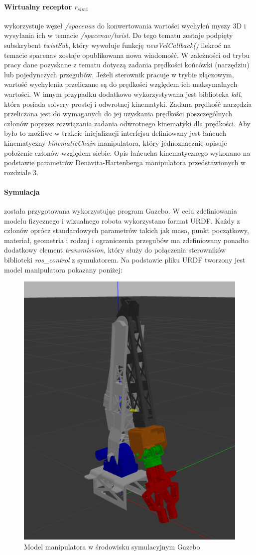 \documentclass[a4paper, 12pt, twoside]{article}
\begin{document}
\paragraph{Wirtualny receptor $r_{sim1}$} wykorzystuje węzeł \textit{/spacenav} do konwertowania wartości wychyleń myszy 3D i wysyłania ich w temacie \textit{/spacenav/twist}. Do tego tematu zostaje podpięty subskrybent \textit{twistSub}, który wywołuje funkcję \textit{newVelCallback()} ilekroć na temacie spacenav zostaje opublikowana nowa wiadomość. W zależności od trybu pracy dane pozyskane z tematu dotyczą zadania prędkości końcówki (narzędziu) lub pojedynczych przegubów. Jeżeli sterownik pracuje w trybie złączowym, wartość wychylenia przeliczane są do prędkości względem ich maksymalnych wartości. W innym przypadku dodatkowo wykorzystywana jest biblioteka \textit{kdl}, która posiada solvery prostej i odwrotnej kinematyki. Zadana prędkość narzędzia przeliczana jest do wymaganych do jej uzyskania prędkości poszczególnych członów poprzez rozwiązania zadania odwrotnego kinematyki dla prędkości. Aby było to możliwe w trakcie inicjalizacji interfejsu definiowany jest łańcuch kinematyczny \textit{kinematicChain} manipulatora, który jednoznacznie opisuje położenie członów względem siebie. Opis łańcucha kinematycznego wykonano na podstawie parametrów Denavita-Hartenberga manipulatora przedstawionych w rozdziale 3.

\paragraph{Symulacja} została przygotowana wykorzystując program Gazebo. W celu zdefiniowania modelu fizycznego i wizualnego robota wykorzystano format URDF. Każdy z członów oprócz standardowych parametrów takich jak masa, punkt początkowy, materiał, geometria i rodzaj i ograniczenia przegubów ma zdefiniowany ponadto dodatkowy element \textit{transmission}, który służy do połączenia sterowników biblioteki \textit{ros\_control} z symulatorem. Na podstawie pliku URDF tworzony jest model manipulatora pokazany poniżej:

\begin{figure}[hbt!]
\centering
\includegraphics[width=0.6\linewidth]{images/simulation.png}
\caption{Model manipulatora w środowisku symulacyjnym Gazebo}
\label{fig:simulation}
\end{figure}
\end{document}
